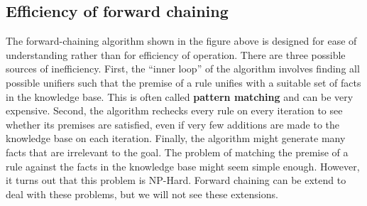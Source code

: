 \subsection{Efficiency of forward chaining}
The forward-chaining algorithm shown in the figure above  is designed for ease of understanding rather than for efficiency of operation. There are three possible sources of inefficiency. First, the “inner loop” of the algorithm involves finding all possible unifiers such that the premise of a rule unifies with a suitable set of facts in the knowledge base. This is often called \textbf{pattern matching} and can be very expensive. Second, the algorithm rechecks every rule on every iteration to see whether its premises are satisfied, even if very few additions are made to the knowledge base on each iteration. Finally, the algorithm might generate many facts that are irrelevant to the goal.\newline\newline
The problem of matching the premise of a rule against the facts in the knowledge base might seem simple enough. However, it turns out that this problem is NP-Hard. Forward chaining can be extend to deal with these problems, but we will not see these extensions.

